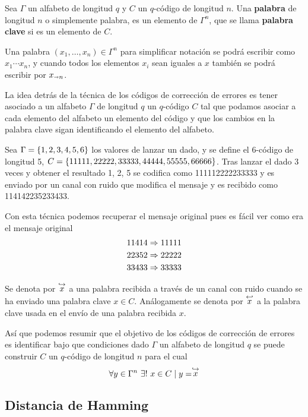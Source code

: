 \begin{definition}
	Sea $\Gamma$ un alfabeto de longitud $q$ y $C$ un $q$-código de longitud $n$.
	Una \textbf{palabra} de longitud $n$ o simplemente palabra, es un elemento de $\Gamma^n$, que se llama \textbf{palabra clave} si es un elemento de $C$.
\end{definition}

Una palabra $(x_1,\dots,x_n)\in\Gamma^n$ para simplificar notación se podrá escribir como $x_1\cdots x_n$, y cuando todos los elementos $x_i$ sean iguales a $x$ también se podrá escribir por $x_{\shortrightarrow n}$.

La idea detrás de la técnica de los códigos de corrección de errores es tener asociado a un alfabeto $\Gamma$ de longitud $q$ un $q$-código $C$ tal que podamos asociar a cada elemento del alfabeto un elemento del código y que los cambios en la palabra clave sigan identificando el elemento del alfabeto.

\begin{example}
	Sea $\Gamma=\left\{1, 2, 3, 4, 5, 6\right\}$ los valores de lanzar un dado, y se define el $6$-código de longitud 5, $C=\left\{11111, 22222, 33333, 44444, 55555, 66666\right\}$.
	Tras lanzar el dado 3 veces y obtener el resultado 1, 2, 5 se codifica como 111112222233333 y es enviado por un canal con ruido que modifica el mensaje y es recibido como 114142235233433.

	Con esta técnica podemos recuperar el mensaje original pues es fácil ver como era el mensaje original
	\begin{align*}
		11414 & \Rightarrow 11111 \\
		22352 & \Rightarrow 22222 \\
		33433 & \Rightarrow 33333
	\end{align*}
\end{example}

Se denota por $\stackrel{\hookrightarrow}{x}$ a una palabra recibida a través de un canal con ruido cuando se ha enviado una palabra clave $x\in C$.
Análogamente se denota por $\stackrel{\hookleftarrow}{x}$ a la palabra clave usada en el envío de una palabra recibida $x$.

Así que podemos resumir que el objetivo de los códigos de corrección de errores es identificar bajo que condiciones dado $\Gamma$ un alfabeto de longitud $q$ se puede construir $C$ un $q$-código de longitud $n$ para el cual
\[
	\forall y\in\Gamma^n\ \exists!\ x\in C \tq y = \push{x}
\]

\subsection{Distancia de Hamming}

